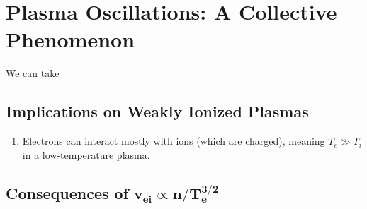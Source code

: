 
\section{Plasma Oscillations: A Collective Phenomenon}
We can take 

\subsection{Implications on Weakly Ionized Plasmas}
\begin{enumerate}
  \item Electrons can interact mostly with ions (which are charged), meaning $T_e \gg T_i$ in a low-temperature plasma.
\end{enumerate}

\subsection{Consequences of $\mathbf{v_{ei} \propto n/T_e^{3/2}}$}


